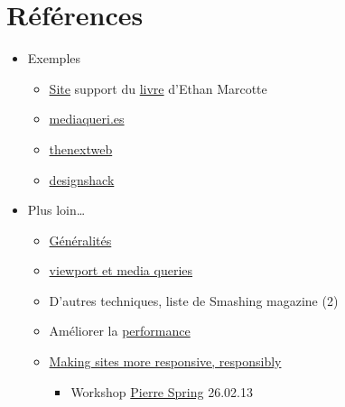 \hypertarget{ruxe9fuxe9rences}{%
\section{Références}\label{ruxe9fuxe9rences}}

\begin{itemize}
\tightlist
\item
  Exemples

  \begin{itemize}
  \tightlist
  \item
    \href{http://responsivewebdesign.com/robot/}{Site} support du
    \href{https://abookapart.com/products/responsive-web-design}{livre}
    d'Ethan Marcotte
  \item
    \href{http://mediaqueri.es/}{mediaqueri.es}
  \item
    \href{http://thenextweb.com/dd/2013/01/13/30-new-inspiring-responsive-design-websites/}{thenextweb}
  \item
    \href{https://designshack.net/articles/css/20-amazing-examples-of-using-media-queries-for-responsive-web-design/}{designshack}
  \end{itemize}
\item
  Plus loin\ldots{}

  \begin{itemize}
  \tightlist
  \item
    \href{http://johnpolacek.github.io/scrolldeck.js/decks/responsive/}{Généralités}
  \item
    \href{http://www.quirksmode.org/blog/archives/2010/09/combining_meta.html}{viewport
    et media queries}
  \item
    D'autres techniques, liste de Smashing magazine (2)
  \item
    Améliorer la
    \href{http://csswizardry.com/2013/01/front-end-performance-for-web-designers-and-front-end-developers/}{performance}
  \item
    \href{https://24ways.org/2014/making-sites-more-responsive-responsibly/}{Making
    sites more responsive, responsibly}

    \begin{itemize}
    \tightlist
    \item
      Workshop
      \href{https://www.slideshare.net/caillou/2013-03-webtuesday-responsive}{Pierre
      Spring} 26.02.13
    \end{itemize}
  \end{itemize}
\end{itemize}

